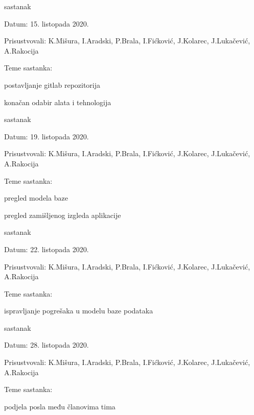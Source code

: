 \begin{packed_enum}
			\item  sastanak
			\item[] \begin{packed_item}
				\item Datum: 15. listopada 2020.
				\item Prisustvovali:  K.Mišura, I.Aradski, P.Brala, I.Fićković, J.Kolarec, J.Lukačević, A.Rakocija
				\item Teme sastanka:
				\begin{packed_item}
					\item  postavljanje gitlab repozitorija
					\item  konačan odabir alata i tehnologija  
				\end{packed_item}
			\end{packed_item}
			
			\item  sastanak
			\item[] \begin{packed_item}
				\item Datum: 19. listopada 2020.
				\item Prisustvovali:  K.Mišura, I.Aradski, P.Brala, I.Fićković, J.Kolarec, J.Lukačević, A.Rakocija
				\item Teme sastanka:
				\begin{packed_item}
					\item  pregled modela baze
					\item  pregled zamišljenog izgleda aplikacije 
				\end{packed_item}
			\end{packed_item}
			
			\item  sastanak
			\item[] \begin{packed_item}
				\item Datum: 22. listopada 2020.
				\item Prisustvovali:  K.Mišura, I.Aradski, P.Brala, I.Fićković, J.Kolarec, J.Lukačević, A.Rakocija
				\item Teme sastanka:
				\begin{packed_item}
					\item  ispravljanje pogrešaka u modelu baze podataka
				\end{packed_item}
			\end{packed_item}
			
			\item  sastanak
			\item[] \begin{packed_item}
				\item Datum: 28. listopada 2020.
				\item Prisustvovali:  K.Mišura, I.Aradski, P.Brala, I.Fićković, J.Kolarec, J.Lukačević, A.Rakocija
				\item Teme sastanka:
				\begin{packed_item}
					\item  podjela posla među članovima tima  
				\end{packed_item}
			\end{packed_item}
			

\end{packed_enum}

